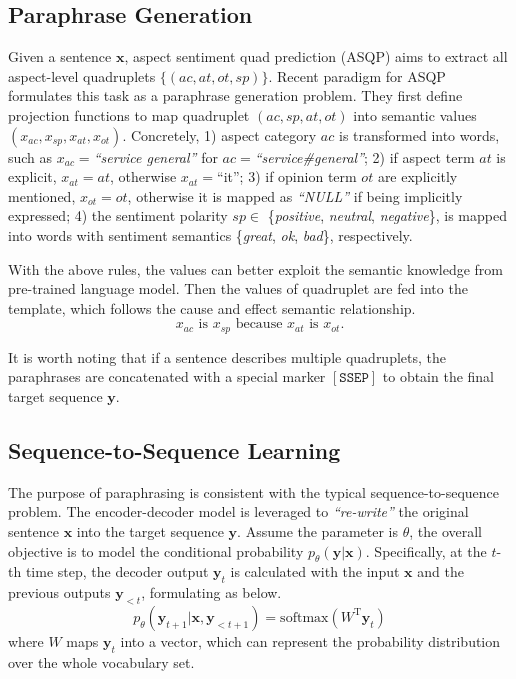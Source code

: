 \documentclass[11pt]{article}
\begin{document}
\subsection{Paraphrase Generation}
Given a sentence $\bm{x}$, aspect sentiment quad prediction (ASQP) aims to extract all aspect-level quadruplets $\{({ac},{at},{ot},{sp})\}$. Recent paradigm for ASQP \cite{zhang-etal-2021-aspect-sentiment} formulates this task as a paraphrase generation problem. They first define projection functions to map quadruplet $({ac},{sp},{at},{ot})$ into semantic values $(x_{ac},x_{sp},x_{at},x_{ot})$. Concretely, 1) aspect category $ac$ is transformed into words, such as $x_{ac}=$\emph{``service general''} for $ac=$\emph{``service\#general''}; 2) if aspect term $at$ is explicit, $x_{at}={at}$, otherwise $x_{at}=$``it''; 3) if opinion term $ot$ are explicitly mentioned, $x_{ot}=ot$, otherwise it is mapped as \emph{``NULL''} if being implicitly expressed; 4) the sentiment polarity $sp\in$ \{\emph{positive}, \emph{neutral}, \emph{negative}\}, is mapped into words with sentiment semantics \{\emph{great}, \emph{ok}, \emph{bad}\}, respectively.

With the above rules, the values can better exploit the semantic knowledge from pre-trained language model. Then the values of quadruplet are fed into the template, which follows the cause and effect semantic relationship.
\begin{equation}
    x_{ac} \text{ is } x_{sp} \text{ because } x_{at} \text{ is } x_{ot}.
    \label{eq:paraphrase_template}
\end{equation}

It is worth noting that if a sentence describes multiple quadruplets, the paraphrases are concatenated with a special marker $\mathtt{[SSEP]}$ to obtain the final target sequence $\bm{y}$.

\subsection{Sequence-to-Sequence Learning}
The purpose of paraphrasing is consistent with the typical sequence-to-sequence problem. The encoder-decoder model is leveraged to \emph{``re-write''} the original sentence $\bm{x}$ into the target sequence $\bm{y}$. Assume the parameter is $\theta$, the overall objective is to model the conditional probability $p_\theta(\bm{y}|\bm{x})$. Specifically, at the $t$-th time step, the decoder output $\bm{y}_t$ is calculated with the input $\bm{x}$ and the previous outputs $\bm{y}_{<t}$, formulating as below.
\begin{equation}
    p_\theta(\bm{y}_{t+1}|\bm{x},\bm{y}_{<t+1})=\mathrm{softmax}(W^{\mathrm{T}}\bm{y}_t)
    \label{eq:conditional}
\end{equation}
where $W$ maps $\bm{y}_t$ into a vector, which can represent the probability distribution over the whole vocabulary set.
\end{document}
